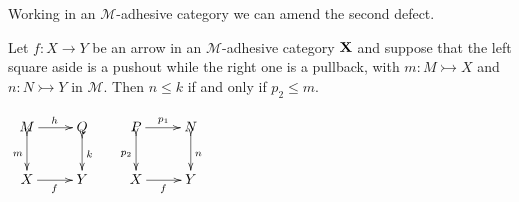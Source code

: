 \documentclass[a4paper,UKenglish,cleveref,pdftex,thm-restate,numberwithinsect,anonymous]{lipics}
\newcommand{\id}[1]{\mathsf{id}_{#1}}
\def\X{\textbf {\textup{X}}}
\def\Set{\textbf {\textup{Set}}}
\begin{document}
\iffalse
	\begin{example}
		In a generic category $\X$, pushout complements may not exist: in $\Set$ the arrows $?_{2}\colon \emptyset \to 2$ and $!_2\colon 2\to 1$ do not have a pushout complement.

		Moreover, composable arrows $f\colon X\to Y$ and $g\colon Y\to Z$ may have  pushout complements which are non-isomorphic: for instance, in $\Set$ the two squares below are both pushouts.

		\[\xymatrix{2 \ar[r]^{!_2} \ar[d]_{\id{2}}& 1 \ar[d]^{\id{1}} & 2 \ar[r]^{!_2} \ar[d]_{!_2}& 1 \ar[d]^{\id{1}}\\ 2 \ar[r]_{!_2}& 1 & 1 \ar[r]_{\id{1}}& 1}\]
	\end{example}
\fi

Working in an $\mathcal{M}$-adhesive category we can amend the second defect.

\noindent
\parbox{8.5cm}{
	\begin{lemma}\label{lem:radj}
		Let $f\colon X \to Y$ be an arrow in an $\mathcal{M}$-adhesive category $\X$ and suppose that the left square aside is a pushout while the  right one is a pullback, with $ m\colon M \rightarrowtail X$ and $n\colon N \rightarrowtail Y$ in $\mathcal{M}$.
		Then $n\leq k$ if and only if $p_2\leq m$.
	\end{lemma}}
\parbox{3cm}{\vspace{-2ex}
	$\xymatrix{M \ar@{>->}[d]_{m}\ar[r]^{h}& Q \ar@{>->}[d]^{k} & P \ar[r]^{p_1} \ar@{>->}[d]_{p_2}& N \ar@{>->}[d]^{n}\\X\ar[r]_{f}&Y &X \ar[r]_f&Y}$}
\end{document}
